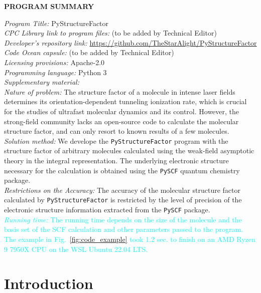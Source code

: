 \documentclass[preprint,12pt]{elsarticle} %
\newcommand{\cyan}[1]{\textcolor{cyan}{#1}}     %
\begin{document}
{\bf \noindent PROGRAM SUMMARY} \\
\begin{small}
\noindent
{\em Program Title:} PyStructureFactor \\
{\em CPC Library link to program files:} (to be added by Technical Editor) \\
{\em Developer's repository link:} \url{https://github.com/TheStarAlight/PyStructureFactor} \\
{\em Code Ocean capsule:} (to be added by Technical Editor) \\
{\em Licensing provisions:} Apache-2.0 \\
{\em Programming language:} Python 3                                  \\
{\em Supplementary material:}                                 \\
{\em Nature of problem:} The structure factor of a molecule in intense laser fields determines its orientation-dependent tunneling ionization rate, which is crucial for the studies of ultrafast molecular dynamics and its control. However, the strong-field community lacks an open-source code to calculate the molecular structure factor, and can only resort to known results of a few molecules. \\
{\em Solution method:} We develope the \texttt{PyStructureFactor} program with the structure factor of arbitrary molecules calculated using the weak-field asymptotic theory in the integral representation. The underlying electronic structure necessary for the calculation is obtained using the \texttt{PySCF} quantum chemistry package. \\
{\em Restrictions on the Accuracy:} The accuracy of the molecular structure factor calculated by \texttt{PyStructureFactor} is restricted by the level of precision of the electronic structure information extracted from the \texttt{PySCF} package. \\
\cyan{{\em Running time:} The running time depends on the size of the molecule and the basis set of the SCF calculation and other parameters passed to the program. The example in Fig.~\ref{fig:code_example} took 1.2 sec. to finish on an AMD Ryzen 9 7950X CPU on the WSL Ubuntu 22.04 LTS.}
\end{small}


\section{Introduction}
\label{sec:intro}
\end{document}
